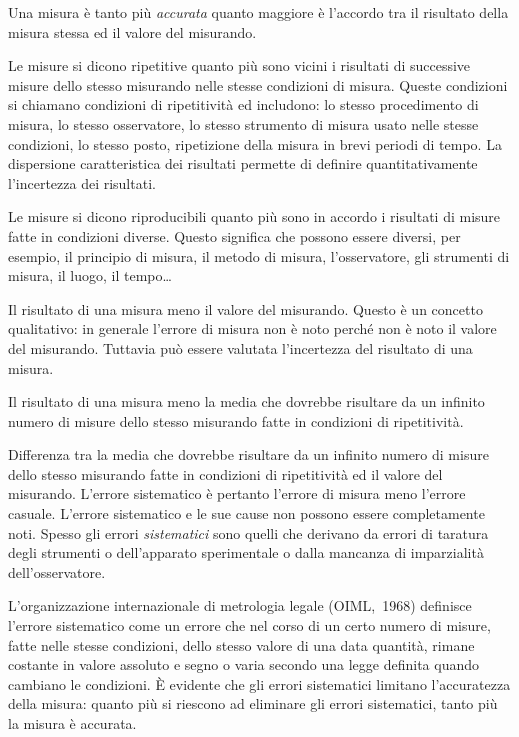 \begin{termslist}
\item{
{Una misura \`e tanto pi\`u {\em accurata} quanto maggiore \`e l'accordo tra
il risultato della misura stessa ed il valore del misurando.}
}
\item{
{Le misure si dicono ripetitive quanto pi\`u sono vicini i risultati di
successive misure dello stesso misurando nelle stesse condizioni di misura.
Queste condizioni si chiamano condizioni di ripetitivit\`a ed includono: lo
stesso procedimento di misura, lo stesso osservatore, lo stesso
strumento di misura usato nelle stesse condizioni, lo stesso posto,
ripetizione della misura in brevi periodi di tempo.
La dispersione caratteristica dei risultati permette di definire
quantitativamente l'incertezza dei risultati.}
}
\item{
{Le  misure si dicono riproducibili quanto pi\`u sono in accordo i risultati
di misure fatte in condizioni diverse. Questo significa che possono essere
diversi, per esempio, il principio di misura, il metodo di misura,
l'osservatore, gli strumenti di misura, il luogo, il tempo\ldots}
}
\item{
{Il risultato di una misura meno il valore del misurando. Questo \`e un
concetto qualitativo: in generale l'errore di misura non \`e noto perch\'e non
\`e noto il valore del misurando.
Tuttavia pu\`o essere valutata l'incertezza del risultato di una misura.}
}
\item{
{Il risultato di una misura meno la media che dovrebbe risultare da un infinito
numero di misure dello stesso misurando fatte in condizioni di
ripetitivit\`a.}
}
\item{
{Differenza tra la media che dovrebbe risultare da un infinito numero di
misure dello stesso misurando fatte in condizioni di ripetitivit\`a ed il
valore del misurando. L'errore sistematico \`e pertanto l'errore di misura
meno l'errore casuale. L'errore sistematico e le sue cause non possono essere
completamente noti. Spesso gli errori {\itshape sistematici} sono quelli che
derivano  da errori di taratura degli
strumenti o dell'apparato sperimentale o dalla mancanza di imparzialit\`a
dell'osservatore.

L'organizzazione internazionale di metrologia legale (OIML,~1968)
definisce l'errore sistematico come un errore che nel corso di un certo numero
di misure, fatte nelle stesse condizioni, dello stesso valore di una data
quantit\`a, rimane costante in valore assoluto e segno o varia secondo una
legge definita quando cambiano le condizioni.
\`E evidente che gli errori sistematici limitano
l'accuratezza della misura: quanto pi\`u si riescono ad eliminare gli
errori sistematici, tanto pi\`u la misura \`e accurata.}
}
\end{termslist}

